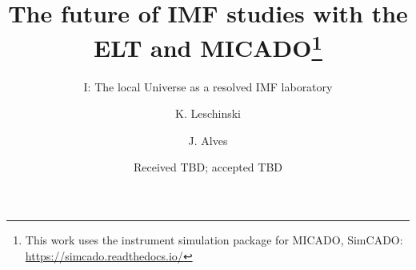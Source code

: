 \documentclass[referee]{aa}
\begin{document}
  \title{The future of IMF studies with the ELT and MICADO\thanks{This work uses the instrument simulation package for MICADO, SimCADO: \url{https://simcado.readthedocs.io/}}}
  \subtitle{I: The local Universe as a resolved IMF laboratory}
  \author{K. Leschinski
     \and
          J. Alves
     }


  \date{Received TBD; accepted TBD}

\end{document}
